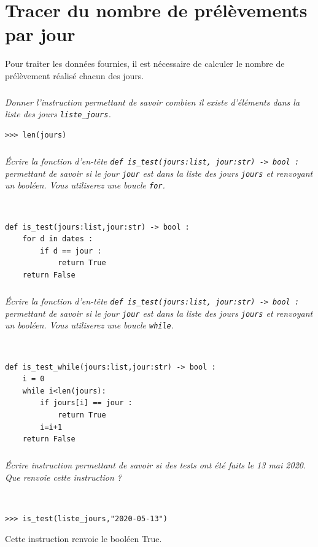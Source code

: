 \documentclass[10pt,fleqn]{article} %
\begin{document}
\section{Tracer du nombre de prélèvements par jour}

Pour traiter les données fournies, il est nécessaire de calculer le nombre de prélèvement réalisé chacun des jours. 

\subparagraph{}
\textit{Donner l'instruction permettant de savoir combien il existe d'éléments dans la liste des jours \texttt{liste\_jours}.}
\ifprof
\begin{corrige}
\begin{lstlisting}
>>> len(jours)
\end{lstlisting}
\end{corrige}
\else
\fi

\subparagraph{}
\textit{Écrire la fonction d’en-tête \texttt{def is\_test(jours:list, jour:str) -> bool :} permettant de savoir si le jour \texttt{jour} est dans la liste des jours \texttt{jours} et renvoyant un booléen. Vous utiliserez une boucle \texttt{for}.}
\ifprof
\begin{corrige}~\\
\begin{lstlisting}
def is_test(jours:list,jour:str) -> bool :
    for d in dates :
        if d == jour :
            return True
    return False
\end{lstlisting}
\end{corrige}
\else
\fi



\subparagraph{}
\textit{Écrire la fonction d’en-tête \texttt{def is\_test(jours:list, jour:str) -> bool :} permettant de savoir si le jour \texttt{jour} est dans la liste des jours \texttt{jours} et renvoyant un booléen. Vous utiliserez une boucle \texttt{while}.}
\ifprof
\begin{corrige}~\\
\begin{lstlisting}
def is_test_while(jours:list,jour:str) -> bool :
    i = 0
    while i<len(jours): 
        if jours[i] == jour :
            return True
        i=i+1
    return False
\end{lstlisting}
\end{corrige}
\else
\fi


\subparagraph{}
\textit{Écrire instruction permettant de savoir si des tests ont été faits le 13 mai 2020. Que renvoie cette instruction ?}
\ifprof
\begin{corrige}~\\
\begin{lstlisting}
>>> is_test(liste_jours,"2020-05-13")
\end{lstlisting}
Cette instruction renvoie le booléen True. 
\end{corrige}
\else
\fi
\end{document}
